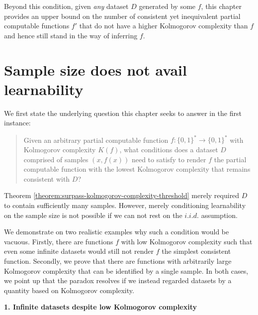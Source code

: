 Beyond this condition, given \textit{any} dataset $D$ generated by some $f$, this chapter provides an upper bound on the number of consistent yet inequivalent partial computable functions $f'$ that do not have a higher Kolmogorov complexity than $f$ and hence still stand in the way of inferring $f$.

\section{Sample size does not avail learnability}
\label{sec:sample-size-does-not-avail-learnability}
We first state the underlying question this chapter seeks to answer in the first instance:
\begin{quote}
	Given an arbitrary partial computable function $f:\{0,1\}^{*}\to\{0,1\}^{*}$ with Kolmogorov complexity $K(f)$, what conditions does a dataset $D$ comprised of samples $(x,f(x))$ need to satisfy to render $f$ the partial computable function with the lowest Kolmogorov complexity that remains consistent with $D$?
\end{quote}

Theorem \ref{theorem:surpass-kolmogorov-complexity-threshold} merely required $D$ to contain sufficiently many samples.
However, merely conditioning learnability on the sample size is not possible if we can not rest on the $i.i.d.$ assumption.

We demonstrate on two realistic examples why such a condition would be vacuous.
Firstly, there are functions $f$ with low Kolmogorov complexity such that even some infinite datasets would still not render $f$ the simplest consistent function.
Secondly, we prove that there are functions with arbitrarily large Kolmogorov complexity that can be identified by a single sample.
In both cases, we point up that the paradox resolves if we instead regarded datasets by a quantity based on Kolmogorov complexity.

\textbf{1. Infinite datasets despite low Kolmogorov complexity}

